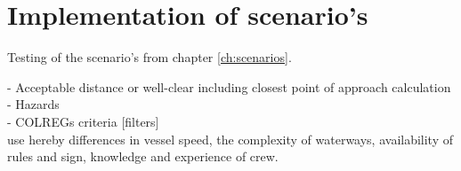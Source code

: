 \chapter{Implementation of scenario's}
Testing of the scenario's from chapter \ref{ch:scenarios}.

- Acceptable distance or well-clear including closest point of approach calculation\\
- Hazards\\
- COLREGs criteria [filters]\\

use hereby differences in vessel speed, the complexity of waterways, availability of rules and sign, knowledge and experience of crew.
